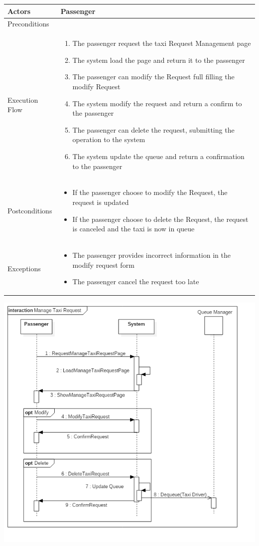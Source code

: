 \documentclass[english]{article}
\providecommand{\tabularnewline}{\\}
\begin{document}
\begin{tabular}{lp{8cm}}
\hline 
Actors  & Passenger \tabularnewline
\hline 
Preconditions  & \tabularnewline
\hline 
Execution Flow  & \begin{enumerate}
\item The passenger request the taxi Request Management page 
\item The system load the page and return it to the passenger 
\item The passenger can modify the Request full filling the modify Request 
\item The system modify the request and return a confirm to the passenger 
\item The passenger can delete the request, submitting the operation to
the system 
\item The system update the queue and return a confirmation to the passenger \end{enumerate}
\tabularnewline
\hline 
Postconditions  & \begin{itemize}
\item If the passenger choose to modify the Request, the request is updated 
\item If the passenger choose to delete the Request, the request is canceled
and the taxi is now in queue \end{itemize}
\tabularnewline
\hline 
Exceptions  & \begin{itemize}
\item The passenger provides incorrect information in the modify request
form 
\item The passenger cancel the request too late \end{itemize}
\tabularnewline
\end{tabular}

\includegraphics[width=\textwidth]{ManageTaxiRequest}
\end{document}
